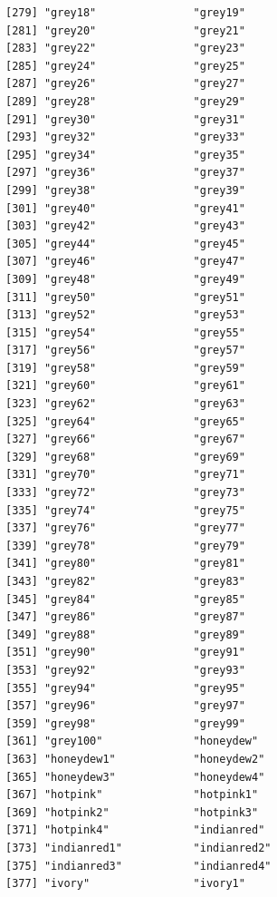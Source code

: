 \documentclass[a4paperpaper,]{article}
\begin{document}
\begin{verbatim}
[279] "grey18"               "grey19"              
[281] "grey20"               "grey21"              
[283] "grey22"               "grey23"              
[285] "grey24"               "grey25"              
[287] "grey26"               "grey27"              
[289] "grey28"               "grey29"              
[291] "grey30"               "grey31"              
[293] "grey32"               "grey33"              
[295] "grey34"               "grey35"              
[297] "grey36"               "grey37"              
[299] "grey38"               "grey39"              
[301] "grey40"               "grey41"              
[303] "grey42"               "grey43"              
[305] "grey44"               "grey45"              
[307] "grey46"               "grey47"              
[309] "grey48"               "grey49"              
[311] "grey50"               "grey51"              
[313] "grey52"               "grey53"              
[315] "grey54"               "grey55"              
[317] "grey56"               "grey57"              
[319] "grey58"               "grey59"              
[321] "grey60"               "grey61"              
[323] "grey62"               "grey63"              
[325] "grey64"               "grey65"              
[327] "grey66"               "grey67"              
[329] "grey68"               "grey69"              
[331] "grey70"               "grey71"              
[333] "grey72"               "grey73"              
[335] "grey74"               "grey75"              
[337] "grey76"               "grey77"              
[339] "grey78"               "grey79"              
[341] "grey80"               "grey81"              
[343] "grey82"               "grey83"              
[345] "grey84"               "grey85"              
[347] "grey86"               "grey87"              
[349] "grey88"               "grey89"              
[351] "grey90"               "grey91"              
[353] "grey92"               "grey93"              
[355] "grey94"               "grey95"              
[357] "grey96"               "grey97"              
[359] "grey98"               "grey99"              
[361] "grey100"              "honeydew"            
[363] "honeydew1"            "honeydew2"           
[365] "honeydew3"            "honeydew4"           
[367] "hotpink"              "hotpink1"            
[369] "hotpink2"             "hotpink3"            
[371] "hotpink4"             "indianred"           
[373] "indianred1"           "indianred2"          
[375] "indianred3"           "indianred4"          
[377] "ivory"                "ivory1"              

\end{verbatim}
\end{document}
